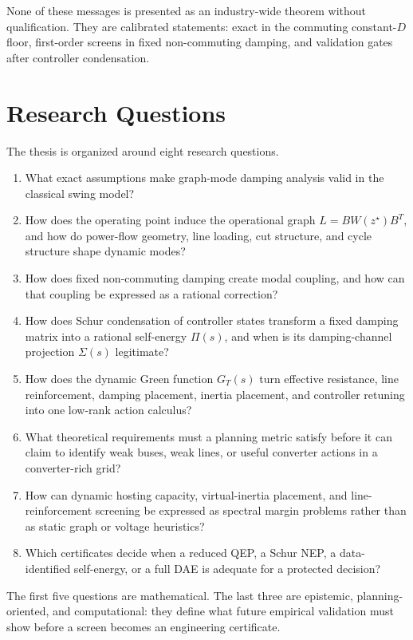 None of these messages is presented as an industry-wide theorem without
qualification. They are calibrated statements: exact in the commuting
constant-\(D\) floor, first-order screens in fixed non-commuting damping, and
validation gates after controller condensation.

\section{Research Questions}

The thesis is organized around eight research questions.

\begin{enumerate}
\item What exact assumptions make graph-mode damping analysis valid in the
classical swing model?
\item How does the operating point induce the operational graph
\(L=B W(z^\star)B^T\), and how do power-flow geometry, line loading, cut
structure, and cycle structure shape dynamic modes?
\item How does fixed non-commuting damping create modal coupling, and how
can that coupling be expressed as a rational correction?
\item How does Schur condensation of controller states transform a fixed
damping matrix into a rational self-energy \(\Pi(s)\), and when is its
damping-channel projection \(\Sigma(s)\) legitimate?
\item How does the dynamic Green function \(G_T(s)\) turn effective
resistance, line reinforcement, damping placement, inertia placement, and
controller retuning into one low-rank action calculus?
\item What theoretical requirements must a planning metric satisfy before it
can claim to identify weak buses, weak lines, or useful converter actions in a
converter-rich grid?
\item How can dynamic hosting capacity, virtual-inertia placement, and
line-reinforcement screening be expressed as spectral margin problems rather
than as static graph or voltage heuristics?
\item Which certificates decide when a reduced QEP, a Schur NEP, a
data-identified self-energy, or a full DAE is adequate for a protected
decision?
\end{enumerate}

The first five questions are mathematical. The last three are epistemic,
planning-oriented, and computational: they define what future empirical
validation must show before a screen becomes an engineering certificate.

